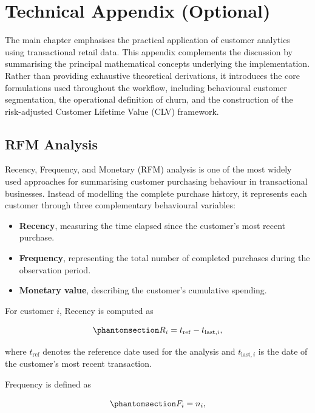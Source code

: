 \documentclass[
  12pt,
  letterpaper,
]{book}
\providecommand{\tightlist}{%
  \setlength{\itemsep}{0pt}\setlength{\parskip}{0pt}}
\begin{document}
\section{Technical Appendix
(Optional)}\label{technical-appendix-optional-3}

The main chapter emphasises the practical application of customer
analytics using transactional retail data. This appendix complements the
discussion by summarising the principal mathematical concepts underlying
the implementation. Rather than providing exhaustive theoretical
derivations, it introduces the core formulations used throughout the
workflow, including behavioural customer segmentation, the operational
definition of churn, and the construction of the risk-adjusted Customer
Lifetime Value (CLV) framework.

\subsection{RFM Analysis}\label{rfm-analysis}

Recency, Frequency, and Monetary (RFM) analysis is one of the most
widely used approaches for summarising customer purchasing behaviour in
transactional businesses. Instead of modelling the complete purchase
history, it represents each customer through three complementary
behavioural variables:

\begin{itemize}
\tightlist
\item
  \textbf{Recency}, measuring the time elapsed since the customer's most
  recent purchase.
\item
  \textbf{Frequency}, representing the total number of completed
  purchases during the observation period.
\item
  \textbf{Monetary value}, describing the customer's cumulative
  spending.
\end{itemize}

For customer \(i\), Recency is computed as

\begin{equation}\phantomsection\label{eq-rfm-recency}{
R_i=t_{\mathrm{ref}}-t_{\mathrm{last},i},
}\end{equation}

where \(t_{\mathrm{ref}}\) denotes the reference date used for the
analysis and \(t_{\mathrm{last},i}\) is the date of the customer's most
recent transaction.

Frequency is defined as

\begin{equation}\phantomsection\label{eq-rfm-frequency}{
F_i=n_i,
}\end{equation}
\end{document}
